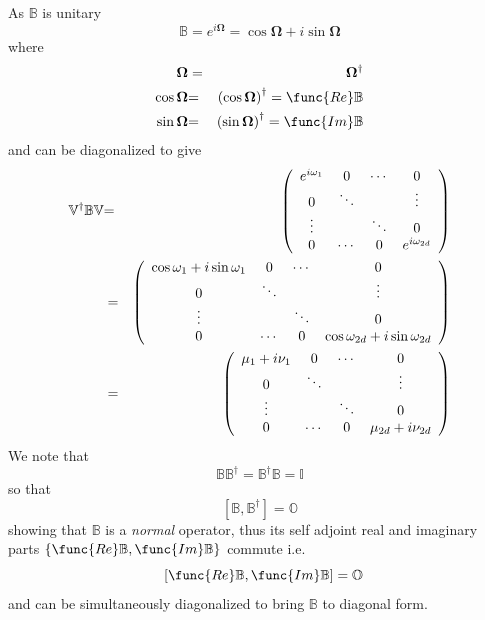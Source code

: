 \documentclass[aps,preprint]{revtex4}
\begin{document}
As $\mathbb{B}$ is unitary 
\begin{equation}
\mathbb{B}=e^{i\mathbf{\Omega }}=\cos \mathbf{\Omega }+i\sin \mathbf{\Omega }
\end{equation}%
where 
\begin{eqnarray}
\mathbf{\Omega } &=&\mathbf{\Omega }^{\dagger }  \notag \\
\cos \mathbf{\Omega } &\mathbf{=}&\left( \cos \mathbf{\Omega }\right)
^{\dagger }=\func{Re}\mathbb{B}  \notag \\
\sin \mathbf{\Omega } &\mathbf{=}&\left( \sin \mathbf{\Omega }\right)
^{\dagger }=\func{Im}\mathbb{B}
\end{eqnarray}%
and can be diagonalized to give 
\begin{eqnarray}
\mathbb{V}^{\dagger }\mathbb{BV} &\mathbb{=}&\left( 
\begin{array}{cccc}
e^{i\omega _{1}} & 0 & \cdots & 0 \\ 
0 & \ddots &  & \vdots \\ 
\vdots &  & \ddots & 0 \\ 
0 & \cdots & 0 & e^{i\omega _{2d}}%
\end{array}%
\right)  \notag \\
&=&\left( 
\begin{array}{cccc}
\cos \omega _{1}+i\sin \omega _{1} & 0 & \cdots & 0 \\ 
0 & \ddots &  & \vdots \\ 
\vdots &  & \ddots & 0 \\ 
0 & \cdots & 0 & \cos \omega _{2d}+i\sin \omega _{2d}%
\end{array}%
\right) \\
&=&\left( 
\begin{array}{cccc}
\mu _{1}+i\nu _{1} & 0 & \cdots & 0 \\ 
0 & \ddots &  & \vdots \\ 
\vdots &  & \ddots & 0 \\ 
0 & \cdots & 0 & \mu _{2d}+i\nu _{2d}%
\end{array}%
\right)
\end{eqnarray}%
We note that 
\begin{equation}
\mathbb{BB}^{\dagger }=\mathbb{B}^{\dagger }\mathbb{B=I}
\end{equation}%
so that 
\begin{equation}
\left[ \mathbb{B},\mathbb{B}^{\dagger }\right] =\mathbb{O}
\end{equation}%
showing that $\mathbb{B}$ is a \emph{normal }operator, thus its self adjoint
real and imaginary parts $\left\{ \func{Re}\mathbb{B},\func{Im}\mathbb{B}%
\right\} $ commute i.e. 
\begin{equation}
\text{ }\left[ \func{Re}\mathbb{B},\func{Im}\mathbb{B}\right] =\mathbb{O}
\end{equation}%
and can be simultaneously diagonalized to bring $\mathbb{B}$ to diagonal
form.
\end{document}
